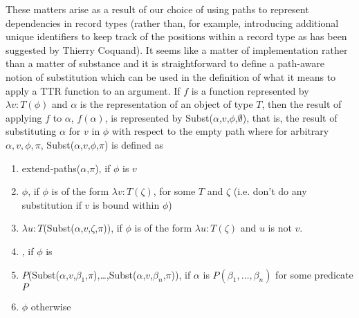 These matters arise as a result of our choice of using paths to
represent dependencies in record types (rather than, for example,
introducing additional unique identifiers to keep track of the
positions within a record type as has been suggested by Thierry Coquand).  It seems like a matter of implementation rather than a matter
of substance and it is straightforward to define a path-aware notion
of substitution which can be used in the definition of what it means
to apply a TTR function to an argument.  If $f$ is a function
represented by $\lambda v:T(\phi)$ and $\alpha$ is the representation
of an object of type $T$, then the result of applying $f$ to $\alpha$,
$f(\alpha)$, is represented by Subst($\alpha$,$v$,$\phi$,$\emptyset$),
that is, the result of substituting $\alpha$ for $v$ in $\phi$ with
respect to the empty path where for arbitrary
$\alpha,v,\phi,\pi$,
Subst($\alpha$,$v$,$\phi$,$\pi$) is defined as 
\begin{enumerate} 
 
\item extend-paths($\alpha$,$\pi$), if $\phi$ is $v$ 
 
\item $\phi$, if $\phi$ is of the form $\lambda v:T(\zeta)$, for some
  $T$ and $\zeta$ (i.e. don't do any substitution if $v$ is bound
  within $\phi$)

\item $\lambda u:T$(Subst($\alpha$,$v$,$\zeta$,$\pi$)), if $\phi$ is
  of the form $\lambda u:T(\zeta)$ and $u$ is not $v$.

\item
  ,
        if $\phi$ is 

\item $P$(Subst($\alpha$,$v$,$\beta_1$,$\pi$),\ldots,Subst($\alpha$,$v$,$\beta_n$,$\pi$)),
  if $\alpha$ is $P(\beta_1,\ldots,\beta_n)$ for some predicate $P$


\item $\phi$ otherwise
 
\end{enumerate} 
 
